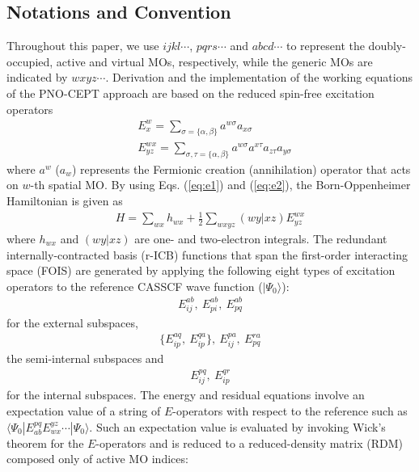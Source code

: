\documentclass[aip,jcp,amsmath]{revtex4-1}
\begin{document}
\subsection{Notations and Convention}
%
Throughout this paper, we use $ijkl\cdots$, $pqrs\cdots$ and $abcd\cdots$ to represent the doubly-occupied, active and virtual MOs, respectively, while the generic MOs are indicated by $wxyz\cdots$.
%
Derivation and the implementation of the working equations of the PNO-CEPT approach are based on the reduced spin-free excitation operators\cite{PhysRevA.43.3392,PhysRevA.41.2391,doi:10.1063/1.448859,Kutzelnigg_Mukherjee1997}
%
\begin{align}
  &E^w_x = \sum_{\sigma=\{\alpha,\beta\}} a^{w\sigma}a_{x\sigma} \label{eq:e1} \\
  &E^{wx}_{yz} = \sum_{\sigma,\tau=\{\alpha,\beta\}} a^{w\sigma}a^{x\tau}a_{z\tau}a_{y\sigma} \label{eq:e2}
\end{align}
%
where $a^{w}$ ($a_w$) represents the Fermionic creation (annihilation) operator that acts on $w$-th spatial MO.
%
By using Eqs. (\ref{eq:e1}) and (\ref{eq:e2}), the Born-Oppenheimer Hamiltonian is given as
\begin{align}
  H=\sum_{wx} h_{wx} + \frac{1}{2}\sum_{wxyz} (wy|xz) E^{wx}_{yz}
\end{align}
%
where $h_{wx}$ and $(wy|xz)$ are one- and two-electron integrals.
%
The redundant internally-contracted basis (r-ICB) functions that span the first-order interacting space (FOIS) are generated by applying the following eight types of excitation operators to the reference CASSCF wave function ($|\Psi_0\rangle$):
%
\begin{align}
  E_{ij}^{ab},\ E_{pi}^{ab},\ E_{pq}^{ab} \label{eq:externalICB}
\end{align}
%
for the external subspaces,
%
\begin{align}
  \{E_{ip}^{aq},\ E_{ip}^{qa}\},\ E_{ij}^{pa},\ E_{pq}^{ra} \label{eq:semiinternalICB}
\end{align}
%
the semi-internal subspaces and
%
\begin{align}
  E_{ij}^{pq},\ E_{ip}^{qr} \label{eq:intternalICB}
\end{align}
%
for the internal subspaces.
%
The energy and residual equations involve an expectation value of a string of $E$-operators with respect to the reference such as $\langle\Psi_0|E^{pq}_{ab}E_{wx}^{yz}\cdots|\Psi_0\rangle$.
%
Such an expectation value is evaluated by invoking Wick's theorem for the $E$-operators and is reduced to a reduced-density matrix (RDM) composed only of active MO indices:
\end{document}
